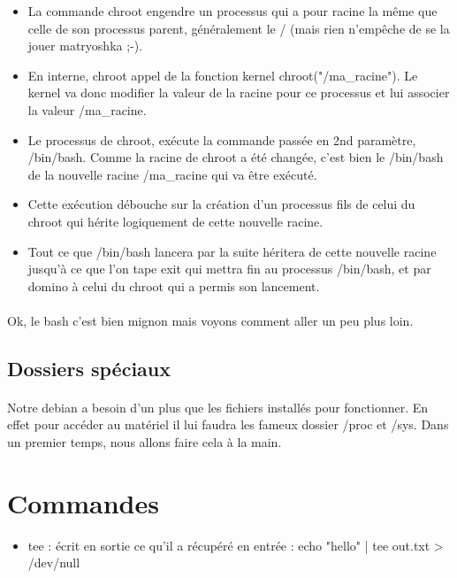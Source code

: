 \documentclass{article}
\begin{document}
\begin{itemize}
  \item  La commande chroot engendre un processus qui a pour racine la même que celle de son processus parent, généralement le / (mais rien n'empêche de se la jouer matryoshka ;-).
  \item En interne, chroot appel de la fonction kernel chroot("/ma\_racine"). Le kernel va donc modifier la valeur de la racine pour ce processus et lui associer la valeur /ma\_racine.
  \item Le processus de chroot, exécute la commande passée en 2nd paramètre, /bin/bash. Comme la racine de chroot a été changée, c'est bien le /bin/bash de la nouvelle racine /ma\_racine qui va être exécuté.
  \item Cette exécution débouche sur la création d'un processus fils de celui du chroot qui hérite logiquement de cette nouvelle racine.
  \item Tout ce que /bin/bash lancera par la suite héritera de cette nouvelle racine jusqu'à ce que l'on tape exit qui mettra fin au processus /bin/bash, et par domino à celui du chroot qui a permis son lancement.
\end{itemize}
\paragraph{}Ok, le bash c'est bien mignon mais voyons comment aller un peu plus loin.

\subsection{Dossiers spéciaux}
\paragraph{}Notre debian a besoin d'un plus que les fichiers installés pour fonctionner. En effet pour accéder au matériel il lui faudra les fameux dossier /proc et /sys. Dans un premier temps, nous allons faire cela à la main.

\section{Commandes}
\begin{itemize}
  \item tee : écrit en sortie ce qu'il a récupéré en entrée : echo "hello" | tee out.txt > /dev/null
\end{itemize}
\end{document}
